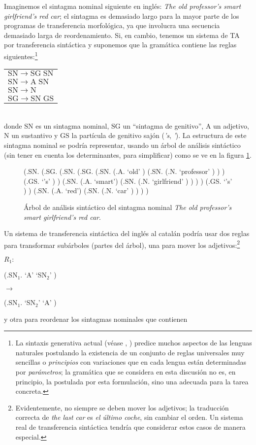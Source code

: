 Imaginemos el sintagma nominal siguiente en inglés: \emph{The old professor's smart girlfriend's red car}; el sintagma es demasiado largo para la mayor parte de los programas de transferencia morfológica, ya que involucra una secuencia demasiado larga de reordenamiento. Si, en cambio, tenemos un sistema de TA por transferencia sintáctica y suponemos que la gramática contiene las reglas siguientes:\footnote{La sintaxis generativa actual (véase \cite{chomsky96b}, \cite{ramos92}) predice muchos aspectos de las lenguas naturales postulando la existencia de un conjunto de reglas universales muy sencillas o \emph{principios} con variaciones que en cada lengua están determinadas por \emph{parámetros}; la gramática que se considera en esta discusión no es, en principio, la postulada por esta formulación, sino una adecuada para la tarea concreta.} \begin{tabular}{l} $\mathrm{SN}\rightarrow \mathrm{SG}\;\mathrm{SN}$\\ $\mathrm{SN} \rightarrow \mathrm{A}\;\mathrm{SN}$\\ $\mathrm{SN}\rightarrow \mathrm{N}$\\ $\mathrm{SG}\rightarrow \mathrm{SN}\;\mathrm{GS}$\\ \end{tabular}\\ donde $\mathrm{SN}$ es un sintagma nominal, $\mathrm{SG}$ un ``sintagma de genitivo'', $\mathrm{A}$ un adjetivo, $\mathrm{N}$ un sustantivo y $\mathrm{GS}$ la partícula de genitivo sajón (\emph{'s}, \emph{'}). La estructura de este sintagma nominal se podría representar, usando un árbol de análisis sintáctico (sin tener en cuenta los determinantes, para simplificar) como se ve en la figura \ref{fg:arbre1}. \begin{figure} \begin{center} \begin{parsetree} (.SN. (.SG. (.SN. (.SG. (.SN. (.A. `old' ) (.SN. (.N. `professor' ) ) ) (.GS. `{'s}' ) ) (.SN. (.A. `smart') (.SN. (.N. `girlfriend' ) ) ) ) (.GS. `{'s}' ) ) (.SN. (.A. `red') (.SN. (.N. `car' ) ) ) ) \end{parsetree} \end{center} \caption{Árbol de análisis sintáctico del sintagma nominal \emph{The old professor's smart girlfriend's red car}.} \label{fg:arbre1} \end{figure} Un sistema de transferencia sintáctica del inglés al catalán podría usar dos reglas para transformar subárboles (partes del árbol), una para mover los adjetivos:\footnote{Evidentemente, no siempre se deben mover los adjetivos; la traducción correcta de \emph{the last car} es \emph{el último coche}, sin cambiar el orden. Un sistema real de transferencia sintáctica tendría que considerar estos casos de manera especial.} \begin{center} $R_1:$ \begin{parsetree} (.\textrm{SN}$_1$. `A' `SN$_2$' ) \end{parsetree} $\longrightarrow$ \begin{parsetree} (.SN$_1$. `SN$_2$' `A' ) \end{parsetree} \end{center} y otra para reordenar los sintagmas nominales que contienen 